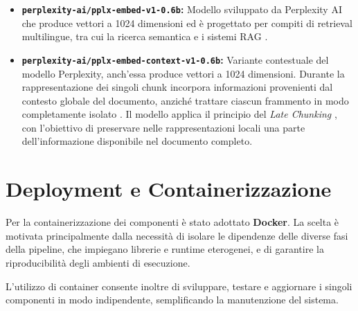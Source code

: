 \begin{itemize}
\begin{itemize}
        \item \textbf{\texttt{perplexity-ai/pplx-embed-v1-0.6b}:} Modello sviluppato da Perplexity AI che produce vettori a 1024 dimensioni ed è progettato per compiti di retrieval multilingue, tra cui la ricerca semantica e i sistemi RAG \cite{eslami2026pplxembed}.
        
        \item \textbf{\texttt{perplexity-ai/pplx-embed-context-v1-0.6b}:} Variante contestuale del modello Perplexity, anch'essa produce vettori a 1024 dimensioni. Durante la rappresentazione dei singoli chunk incorpora informazioni provenienti dal contesto globale del documento, anziché trattare ciascun frammento in modo completamente isolato \cite{eslami2026pplxembed}. Il modello applica il principio del \textit{Late Chunking} \cite{latechunking}, con l'obiettivo di preservare nelle rappresentazioni locali una parte dell'informazione disponibile nel documento completo.
    \end{itemize}
\end{itemize}

\section{Deployment e Containerizzazione}

Per la containerizzazione dei componenti è stato adottato \textbf{Docker}. La scelta è motivata principalmente dalla necessità di isolare le dipendenze delle diverse fasi della pipeline, che impiegano librerie e runtime eterogenei, e di garantire la riproducibilità degli ambienti di esecuzione.

L'utilizzo di container consente inoltre di sviluppare, testare e aggiornare i singoli componenti in modo indipendente, semplificando la manutenzione del sistema.
